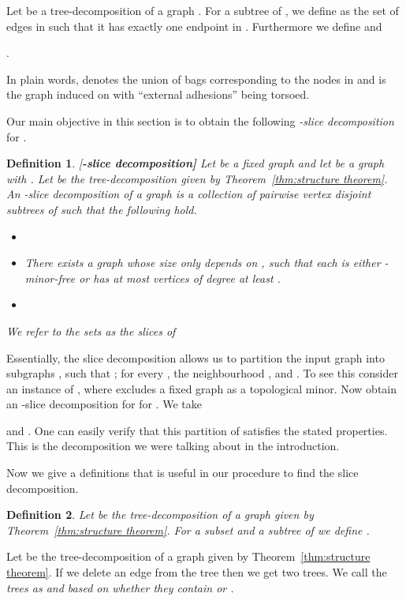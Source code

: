 \documentclass[11pt]{article}
\newtheorem{definition}{Definition}
\begin{document}
Let  be a tree-decomposition of a graph . For a subtree  of , we define  as the set of edges in  such that it has exactly one endpoint in . Furthermore we define  and 
\begin{center}
.
\end{center}
In plain words,  denotes the union of bags corresponding to the nodes in  and  is the graph induced on   with ``external adhesions'' being torsoed. 

Our main objective in this section is to obtain the following {\em-slice decomposition} for . 

\begin{definition}{\rm [{\bf -slice decomposition]}}
Let  be a fixed graph and let  be a graph with .  Let   be the 
tree-decomposition given by Theorem~\ref{thm:structure theorem}. An {\em-slice decomposition} of a graph 
is a collection  of pairwise vertex disjoint  subtrees   of  such that the 
following hold. 

\begin{itemize}
\item 
\item There exists a graph  whose size only depends on , such that each  is either -minor-free
or  has at most  vertices of degree at least .

\item 


\end{itemize}
We refer to the sets    as the {\em slices} of 
\end{definition}

Essentially, the slice decomposition allows us to  partition the input graph  into subgraphs , such that 
 ; for every , the neighbourhood ,  and . To see this consider an instance  of , where  excludes a fixed graph  as a topological minor.  Now obtain an   -slice decomposition for  for . We take 
 
and . One can easily verify that this partition of  satisfies the stated properties.  
 This is the decomposition we were talking about in the introduction. 
 
 Now we give a definitions that is useful in our procedure to find  the slice decomposition. 
\begin{definition}
Let  be the tree-decomposition of a graph  given by  Theorem~\ref{thm:structure theorem}. For a subset 
 and a subtree  of  we define .  
\end{definition}

Let  be the tree-decomposition of a graph  given by  Theorem~\ref{thm:structure theorem}.   
If we delete an edge  from the tree  then 
we get two trees. We call the {\em trees as  and  based on whether they contain  or . } 
\end{document}
